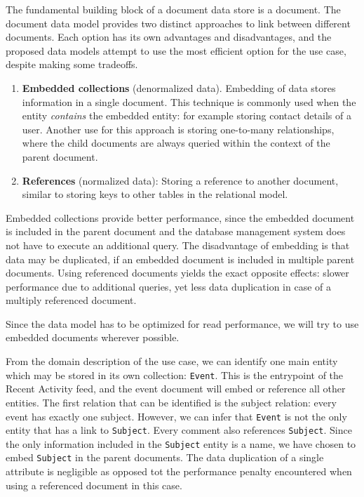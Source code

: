 
The fundamental building block of a document data store is a document.
The document data model provides two distinct approaches to link between different documents.
Each option has its own advantages and disadvantages, and the proposed data models attempt to use the most efficient option for the use case, despite making some tradeoffs.

\begin{enumerate}
  \item \textbf{Embedded collections} (denormalized data).
        Embedding of data stores information in a single document.
        This technique is commonly used when the entity \textit{contains} the embedded entity: for example storing contact details of a user.
        Another use for this approach is storing one-to-many relationships, where the child documents are always queried within the context of the parent document.
  \item \textbf{References} (normalized data): Storing a reference to another document, similar to storing keys to other tables in the relational model.
\end{enumerate}

Embedded collections provide better performance, since the embedded document is included in the parent document and the database management system does not have to execute an additional query.
The disadvantage of embedding is that data may be duplicated, if an embedded document is included in multiple parent documents.
Using referenced documents yields the exact opposite effects: slower performance due to additional queries, yet less data duplication in case of a multiply referenced document.

Since the data model has to be optimized for read performance, we will try to use embedded documents wherever possible.

From the domain description of the use case, we can identify one main entity which may be stored in its own collection: \texttt{Event}.
This is the entrypoint of the Recent Activity feed, and the event document will embed or reference all other entities.
The first relation that can be identified is the subject relation: every event has exactly one subject.
However, we can infer that \texttt{Event} is not the only entity that has a link to \texttt{Subject}.
Every comment also references \texttt{Subject}.
Since the only information included in the \texttt{Subject} entity is a name, we have chosen to embed \texttt{Subject} in the parent documents.
The data duplication of a single attribute is negligible as opposed tot the performance penalty encountered when using a referenced document in this case.


